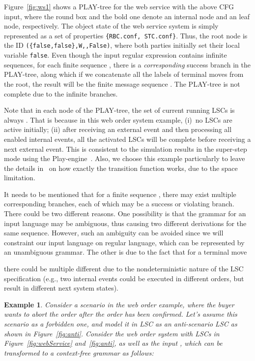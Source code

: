 \documentclass[]{llncs}
\newtheorem{Ex}{Example}
\begin{document}
\noindent
Figure~\ref{fig:ws1} shows a PLAY-tree for the web service with the above CFG input,
where the round box and the bold one denote an internal node and an leaf node, respectively.
The object state of the web service system is simply represented as a set of properties
{\tt \{RBC.conf, STC.conf\}}. Thus, the root node is the ID
{\tt (\{false,false\},W,,False)}, where both parties initially
set their local variable {\tt false}.
Even though the input regular expression contains infinite sequences,
for each finite sequence , there is a {\em corresponding} success branch in the
PLAY-tree, along which if we concatenate all the labels of terminal moves
from the root, the result will be the finite message sequence .
The PLAY-tree is not complete due to the
infinite branches.

Note that in each node of the PLAY-tree, the set
of current running LSCs is always . That is because in this web order system example,
(i)~no LSCs are active initially; (ii) after receiving an external event
and then processing all enabled internal events,
all the activated LSCs will be complete before receiving a next external event. This is consistent to the simulation results in the super-step mode
using the Play-engine~\cite{HM03}. Also, we choose this example particularly
to leave the details in~\cite{HM03} on how exactly the transition function  works, due to the space limitation.

It needs to be mentioned that for a finite sequence ,
there may exist multiple corresponding branches, each of which may be a
success or violating branch. There could be two different reasons.
One possibility is that the grammar  for an input language may be
ambiguous, thus causing two different derivations for the same sequence.
However, such an ambiguity can be avoided since we will constraint our input
language on regular language, which can be represented by an unambiguous grammar. The other is due to the fact that for a terminal move

there could be multiple different 
due to the nondeterministic nature of the LSC specification (e.g., two
internal events could be executed in different orders, but
result in different next system states).








\begin{Ex}
  Consider a scenario in the web order example, where the buyer wants
  to abort the order after the order has been confirmed. Let's assume
  this scenario as a forbidden one, and model it in LSC as an anti-scenario LSC
  as shown in Figure~\ref{fig:anti}.
  Consider the web order system with LSCs in Figure~\ref{fig:webService} and~\ref{fig:anti},
  as well as the input ,
  which can be transformed to a context-free grammar
   as follows:
  
\label{ex:webService2}
\end{Ex}
\end{document}
